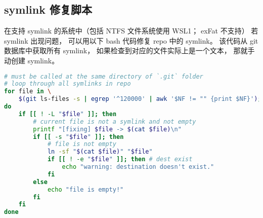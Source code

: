 \subsection{symlink 修复脚本}

在支持 symlink 的系统中（包括 NTFS 文件系统使用 WSL1； exFat 不支持） 若 symlink 出现问题， 可以用以下 bash 代码修复 repo 中的 symlink。 该代码从 git 数据库中获取所有 symlink， 如果检查到对应的文件实际上是一个文本， 那就手动创建 symlink。

\begin{lstlisting}[language=bash, caption=fix\_git\_symlink.sh]
# must be called at the same directory of `.git` folder
# loop through all symlinks in repo
for file in \
	$(git ls-files -s | egrep '^120000' | awk '$NF != "" {print $NF}');
do
	if [[ ! -L "$file" ]]; then
		# current file is not a symlink and not empty
		printf "[fixing] $file -> $(cat $file)\n"
		if [[ -s "$file" ]]; then
			# file is not empty
			ln -sf "$(cat $file)" "$file"
			if [[ ! -e "$file" ]]; then # dest exist
				echo "warning: destination doesn't exist."
			fi
		else
			echo "file is empty!"
		fi
	fi
done
\end{lstlisting}
